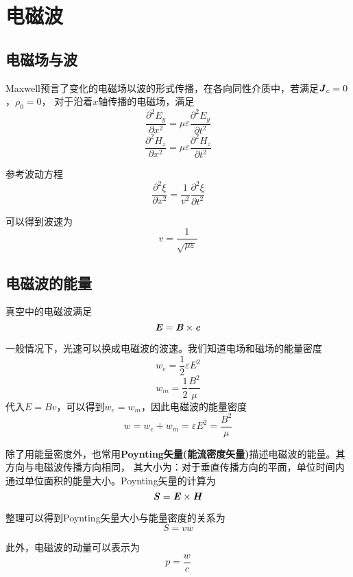 \documentclass[UTF8,openany]{book}
\begin{document}
	\section{电磁波}
	\subsection{电磁场与波}
	\par Maxwell预言了变化的电磁场以波的形式传播，在各向同性介质中，若满足$\textbf{\textit{J}}_c=0$，$\rho_0=0$，
	对于沿着$x$轴传播的电磁场，满足
	\[
	\frac{\partial^2 E_y}{\partial x^2}=\mu\varepsilon\frac{\partial^2 E_y}{\partial t^2}	
	\]
	\[
	\frac{\partial^2 H_z}{\partial x^2}=\mu\varepsilon\frac{\partial^2 H_z}{\partial t^2}	
	\]
	\par 参考波动方程
	\[
	\frac{\partial^2 \xi}{\partial x^2}=\frac{1}{v^2}\frac{\partial^2 \xi}{\partial t^2}	
	\]
	\par 可以得到波速为
	\[
	v=\frac{1}{\sqrt{\mu\varepsilon}}	
	\]
	\subsection{电磁波的能量}
	\par 真空中的电磁波满足
	\[
	\textbf{\textit{E}}=\textbf{\textit{B}}\times\textbf{\textit{c}}	
	\]
	\par 一般情况下，光速可以换成电磁波的波速。我们知道电场和磁场的能量密度
	\[
	w_e=\frac{1}{2}\varepsilon E^2	
	\]
	\[
	w_m=\frac{1}{2}\frac{B^2}{\mu}	
	\]
	代入$E=Bv$，可以得到$w_e=w_m$，因此电磁波的能量密度
	\[
	w=w_e+w_m=\varepsilon E^2=\frac{B^2}{\mu}	
	\]
	\par 除了用能量密度外，也常用\textbf{Poynting矢量(能流密度矢量)}描述电磁波的能量。其方向与电磁波传播方向相同，
	其大小为：对于垂直传播方向的平面，单位时间内通过单位面积的能量大小。Poynting矢量的计算为
	\[
	\textbf{\textit{S}}=\textbf{\textit{E}}\times\textbf{\textit{H}}	
	\]
	\par 整理可以得到Poynting矢量大小与能量密度的关系为
	\[
	S=vw	
	\]
	\par 此外，电磁波的动量可以表示为
	\[
	p=\frac{w}{c}	
	\]
\end{document}
